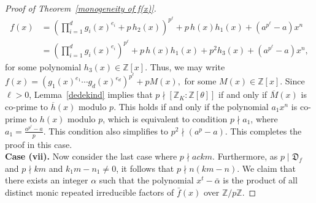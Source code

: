 \documentclass[10pt,a4paper]{amsart}
\newcommand{\D}{\mathfrak{D}}
\newcommand{\Z}{\mathbb{Z}}
\begin{document}
\begin{proof}[Proof of Theorem~\ref{monogeneity of f(x)}]
\begin{align*}
f(x)
&= \left(\prod_{i=1}^{d} g_{i}(x)^{e_{i}} + p\,h_{2}(x)\right)^{p^{\ell}}
   + p\,h(x)h_{1}(x) + (a^{p^{\ell}}-a)x^{n} \\
&= \left(\prod_{i=1}^{d} g_{i}(x)^{e_{i}}\right)^{p^{\ell}}
   + p\,h(x)h_{1}(x) + p^{2}h_{3}(x) + (a^{p^{\ell}}-a)x^{n},
\end{align*}
for some polynomial $h_{3}(x)\in\mathbb{Z}[x]$. Thus, we may write 
$
f(x)=\left(g_{1}(x)^{e_{1}}\cdots g_{d}(x)^{e_{d}}\right)^{p^{\ell}} + pM(x),
$ for some $M(x)\in\mathbb{Z}[x]$. Since $\ell>0$, Lemma~\ref{dedekind} implies that $p \nmid [\mathbb{Z}_{K}:\mathbb{Z}[\theta]]$ if and only if $\overline{M}(x)$ is co-prime to $\overline{h}(x)$ modulo $p$.
This holds if and only if the polynomial $a_1 x^{n}$ is co-prime to $h(x)$ modulo $p$,
which is equivalent to condition $p\nmid a_1$, where $a_1=\frac{a^{p^{\ell}}-a}{p}.$ This condition also simplifies to $p^{2}\nmid (a^{p}-a)$. This completes the proof in this case.\\[2mm] 
\textbf{Case (vii).} Now consider the last  case where $p \nmid ackm $. Furthermore, as $p\mid \D_f$ and $p\nmid km$ and $k_1m-n_1 \neq 0$, it follows that $p \nmid n(km-n)$. We claim that there exists an integer $\alpha$ such that the polynomial $x^t - \bar{\alpha}$ is the product of all distinct monic repeated irreducible factors of $\bar{f}(x)$ over $\Z/p\Z$. 
	

\end{proof}
\end{document}
